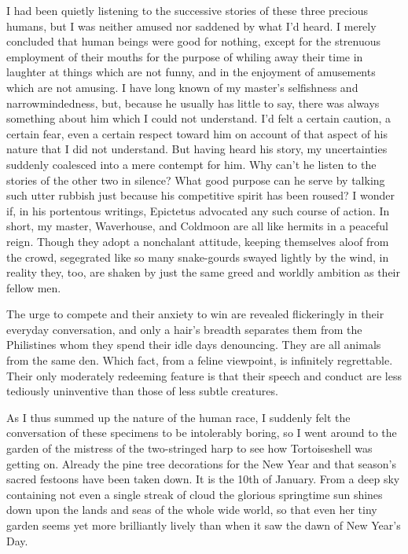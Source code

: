\documentclass[12pt, openright]{book}
\begin{document}
I had been quietly listening to the successive stories of these three
precious humans, but I was neither amused nor saddened by what I'd
heard. I merely concluded that human beings were good for nothing,
except for the strenuous employment of their mouths for the purpose of
whiling away their time in laughter at things which are not funny, and
in the enjoyment of amusements which are not amusing. I have long known
of my master's selfishness and narrowmindedness, but, because he usually
has little to say, there was always something about him which I could
not understand. I'd felt a certain caution, a certain fear, even a
certain respect toward him on account of that aspect of his nature that
I did not understand. But having heard his story, my uncertainties
suddenly coalesced into a mere contempt for him. Why can't he listen to
the stories of the other two in silence? What good purpose can he serve
by talking such utter rubbish just because his competitive spirit has
been roused? I wonder if, in his portentous writings, Epictetus
advocated any such course of action. In short, my master, Waverhouse,
and Coldmoon are all like hermits in a peaceful reign. Though they adopt
a nonchalant attitude, keeping themselves aloof from the crowd,
segegrated like so many snake-gourds swayed lightly by the wind, in
reality they, too, are shaken by just the same greed and worldly
ambition as their fellow men.

The urge to compete and their anxiety to win are revealed flickeringly
in their everyday conversation, and only a hair's breadth separates them
from the Philistines whom they spend their idle days denouncing. They
are all animals from the same den. Which fact, from a feline viewpoint,
is infinitely regrettable. Their only moderately redeeming feature is
that their speech and conduct are less tediously uninventive than those
of less subtle creatures.

As I thus summed up the nature of the human race, I suddenly felt the
conversation of these specimens to be intolerably boring, so I went
around to the garden of the mistress of the two-stringed harp to see how
Tortoiseshell was getting on. Already the pine tree decorations for the
New Year and that season's sacred festoons have been taken down. It is
the 10th of January. From a deep sky containing not even a single streak
of cloud the glorious springtime sun shines down upon the lands and seas
of the whole wide world, so that even her tiny garden seems yet more
brilliantly lively than when it saw the dawn of New Year's Day.
\end{document}
